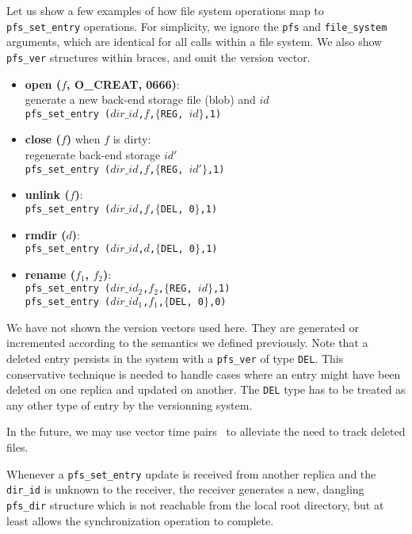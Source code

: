 Let us show a few examples of how file system operations map to {\tt
pfs\_set\_entry} operations.  For simplicity, we ignore the {\tt pfs}
and {\tt file\_system} arguments, which are identical for all calls
within a file system.  We also show \texttt{pfs\_ver} structures
within braces, and omit the version vector.

\begin{itemize}
  \item \textbf{open ($f$, O\_CREAT, 0666)}: \\
    generate a new back-end storage file (blob) and $id$ \\
    {\tt pfs\_set\_entry ($dir\_id$,$f$,$\{$REG, $id$$\}$,1)}

  \item \textbf{close ($f$)} when $f$ is dirty: \\
    regenerate back-end storage $id'$ \\
    {\tt pfs\_set\_entry ($dir\_id$,$f$,$\{$REG, $id'$$\}$,1)}
    
  \item \textbf{unlink ($f$)}: \\
    {\tt pfs\_set\_entry ($dir\_id$,$f$,$\{$DEL, 0$\}$,1)}

  \item \textbf{rmdir ($d$)}: \\
    {\tt pfs\_set\_entry ($dir\_id$,$d$,$\{$DEL, 0$\}$,1)}

  \item \textbf{rename ($f_1$, $f_2$)}: \\
    {\tt pfs\_set\_entry ($dir\_id_2$,$f_2$,$\{$REG, $id$$\}$,1)} \\
    {\tt pfs\_set\_entry ($dir\_id_1$,$f_1$,$\{$DEL, 0$\}$,0)}
\end{itemize}

We have not shown the version vectors used here. They are generated or
incremented according to the semantics we defined previously. Note
that a deleted entry persists in the system with a \texttt{pfs\_ver}
of type {\tt DEL}\@.  This conservative technique is needed to handle
cases where an entry might have been deleted on one replica and
updated on another. The {\tt DEL} type has to be treated as any other
type of entry by the versionning system.


In the future, we may use
vector time pairs~\cite{cox:tra} to alleviate the need to track
deleted files.

Whenever a {\tt pfs\_set\_entry} update is received from another
replica and the {\tt dir\_id} is unknown to the receiver, the receiver
generates a new, dangling {\tt pfs\_dir} structure which is not
reachable from the local root directory, but at least allows the
synchronization operation to complete.

